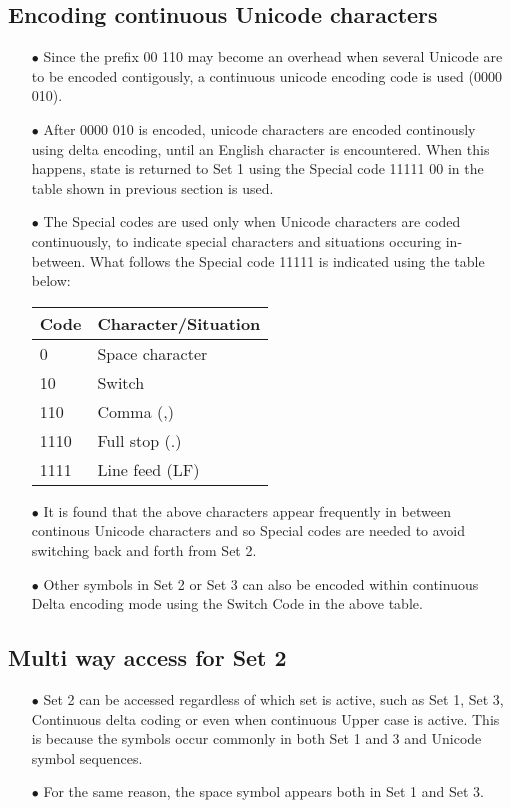\documentclass[]{article}
\begin{document}
	\subsection{Encoding continuous Unicode characters}
	\begin{itemize}
		\item[$\bullet$] Since the prefix 00 110 may become an overhead when several Unicode are to be encoded contigously, a continuous unicode encoding code is used (0000 010).
		\item[$\bullet$] After 0000 010 is encoded, unicode characters are encoded continously using delta encoding, until an English character is encountered. When this happens, state is returned to Set 1 using the Special code 11111 00 in the table shown in previous section is used.
		\item[$\bullet$] The Special codes are used only when Unicode characters are coded continuously, to indicate special characters and situations occuring in-between. What follows the Special code 11111 is indicated using the table below:
		\item[] \begin{tabular}{ | l | l |} \hline
			\textbf{Code} & \textbf{Character/Situation} \\ \hline
			0 & Space character \\ \hline
			10 & Switch \\ \hline
			110 & Comma (,) \\ \hline
			1110 & Full stop (.) \\ \hline
			1111 & Line feed (LF) \\ \hline
		\end{tabular}
		\item[$\bullet$] It is found that the above characters appear frequently in between continous Unicode characters and so Special codes are needed to avoid switching back and forth from Set 2.
		\item[$\bullet$] Other symbols in Set 2 or Set 3 can also be encoded within continuous Delta encoding mode using the Switch Code in the above table.
	\end{itemize}
	
	\subsection{Multi way access for Set 2}
	\begin{itemize}
		\item[$\bullet$] Set 2 can be accessed regardless of which set is active, such as Set 1, Set 3, Continuous delta coding or even when continuous Upper case is active. This is because the symbols occur commonly in both Set 1 and 3 and Unicode symbol sequences.
		\item[$\bullet$] For the same reason, the space symbol appears both in Set 1 and Set 3.
	\end{itemize}
	
\end{document}
